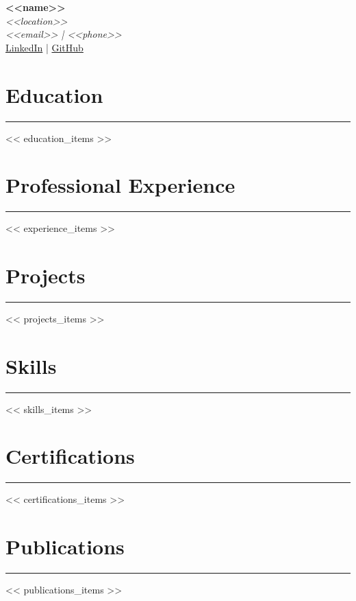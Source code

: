 \documentclass[a4paper,10pt]{article}
\renewcommand{\maketitle}{%
\begin{center}
    {\Huge \textbf{<<name>>}} \\
    \vspace{2mm}
    \textit{<<location>>} \\
    \textit{<<email>> | <<phone>>} \\
    \href{<<linkedin>>}{LinkedIn} | \href{<<github>>}{GitHub}
\end{center}}
\begin{document}
\maketitle
\section*{Education}
\rule{\textwidth}{0.5pt}
\begin{itemize}[leftmargin=*]
<< education_items >>
\end{itemize}

\section*{Professional Experience}
\rule{\textwidth}{0.5pt}
\begin{itemize}[leftmargin=*]
<< experience_items >>
\end{itemize}

\section*{Projects}
\rule{\textwidth}{0.5pt}
\begin{itemize}[leftmargin=*]
<< projects_items >>
\end{itemize}

\section*{Skills}
\rule{\textwidth}{0.5pt}
\begin{itemize}[leftmargin=*]
<< skills_items >>
\end{itemize}

\section*{Certifications}
\rule{\textwidth}{0.5pt}
\begin{itemize}[leftmargin=*]
<< certifications_items >>
\end{itemize}

\section*{Publications}
\rule{\textwidth}{0.5pt}
\begin{itemize}[leftmargin=*]
<< publications_items >>
\end{itemize}
\end{document}
